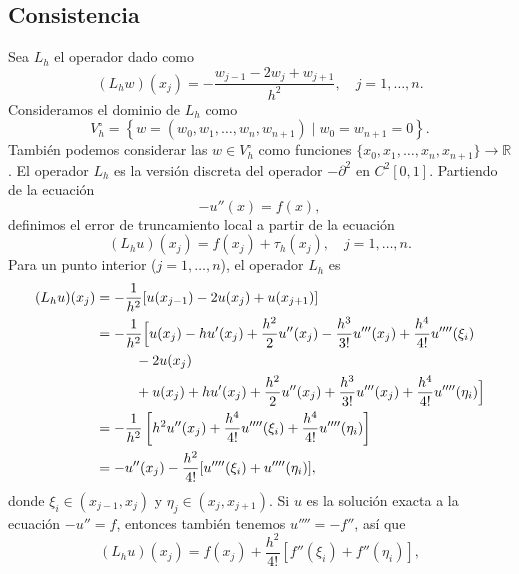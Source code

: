 \documentclass[11pt,letterpaper]{report}
\newcommand\R{\mathbb R}
\begin{document}
\subsection{Consistencia}

Sea $L_h$ el operador dado como
\begin{equation}
  (L_hw)(x_j)
  =
  -\frac{w_{j-1}-2w_j+w_{j+1}}{h^{2}}, \quad j=1,\dots,n
.\end{equation}
Consideramos el dominio de $L_h$ como
\begin{equation}
  V_{h}^{\circ} =
  \left\{
    w=(w_0,w_1,\dots,w_n,w_{n+1}) \mid w_0=w_{n+1}=0
  \right\}
.\end{equation}
También podemos considerar las $w\in V_h^{\circ}$ como funciones
$\{x_0,x_1,\dots,x_n,x_{n+1}\}\to\R$.
El operador $L_h$ es la versión discreta del operador $-\partial^{2}$
en $C^{2}[0,1]$. Partiendo de la ecuación
\begin{equation}
  -u''(x) = f(x)
,\end{equation}
definimos el error de truncamiento local a partir de la ecuación
\begin{equation}
  (L_h u)(x_j) = f(x_j) + \tau_h(x_j), \quad j=1,\dots,n
.\end{equation}
Para un punto interior ($j=1,\dots,n$), el operador $L_h$ es
\begin{align}
  (L_hu)(x_j)
  &= -\frac{1}{h^{2}}[u(x_{j-1})-2u(x_j)+u(x_{j+1})] \\
  &= -\frac{1}{h^{2}}
  \Big[
    u(x_j)
    - hu'(x_j)
    + \frac{h^{2}}{2}u''(x_j)
    - \frac{h^{3}}{3!} u'''(x_j)
    + \frac{h^{4}}{4!}u''''(\xi_i)  \\
  &\hspace{10mm} - 2u(x_j) \\
  &\hspace{10mm}
    + u(x_j)
    + hu'(x_j)
    + \frac{h^{2}}{2}u''(x_j)
    + \frac{h^{3}}{3!} u'''(x_j)
    + \frac{h^{4}}{4!}u''''(\eta_i)
  \Big]
  \\
  &= -\frac{1}{h^{2}}
  \left[
    h^{2}u''(x_j)
    + \frac{h^{4}}{4!}u''''(\xi_i)
    + \frac{h^{4}}{4!}u''''(\eta_i)
  \right] \\
  &=
  -
    u''(x_j)
  -
    \frac{h^{2}}{4!} [ u''''(\xi_i) + u''''(\eta_i) ]
,\end{align}
donde $\xi_i\in(x_{j-1},x_{j})$ y $\eta_j\in(x_{j},x_{j+1})$.
Si $u$ es la solución exacta a la ecuación $-u''=f$, entonces también
tenemos $u''''=-f''$, así que
\begin{equation}
  (L_hu)(x_j)
  =
  f(x_j) + \frac{h^{2}}{4!} [ f''(\xi_i) + f''(\eta_i) ]
,\end{equation}
\end{document}
